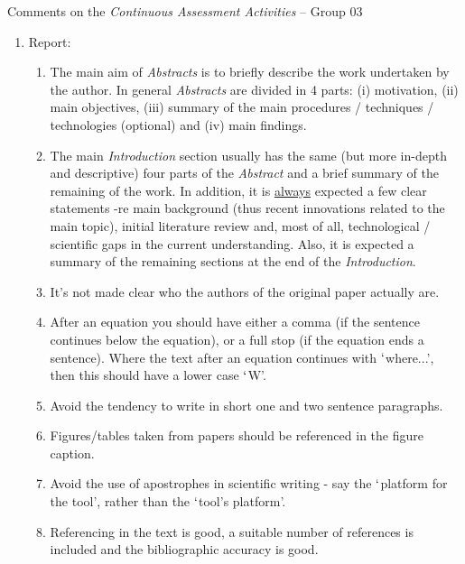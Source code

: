 \documentclass[14pt,twoside]{report}
\begin{document}
\clearpage



\bigskip

\begin{center}
  {\Large Comments on the {\it Continuous Assessment Activities} -- Group 03}
\end{center}

\begin{enumerate}

\item Report:
\begin{enumerate}
%
\item The main aim of {\it Abstracts} is to briefly describe the work undertaken by the author. In general {\it Abstracts} are divided in 4 parts: (i) motivation, (ii) main objectives, (iii) summary of the main procedures / techniques / technologies (optional) and (iv) main findings. 
%
\item The main {\it Introduction} section usually has the same (but more in-depth and descriptive) four parts of the {\it Abstract} and a brief summary of the remaining of the work. In addition, it is \underline{always} expected a few clear statements -re main background (thus recent innovations related to the main topic), initial literature review and, most of all, technological / scientific gaps in the current understanding. Also, it is expected a summary of the remaining sections at the end of the {\it Introduction}.
%
\item It's not made clear who the authors of the original paper actually are.
%
\item After an equation you should have either a comma (if the sentence continues below the equation), or a full stop (if the equation ends a sentence). Where the text after an equation continues with $\lq$where...', then this should have a lower case $\lq$W'.
%
\item Avoid the tendency to write in short one and two sentence paragraphs.
%
\item Figures/tables taken from papers should be referenced in the figure caption.
%
\item Avoid the use of apostrophes in scientific writing - say the $\lq$platform for the tool', rather than the $\lq$tool's platform'.
%
\item Referencing in the text is good, a suitable number of references is included and the bibliographic accuracy is good.

\end{enumerate}
\end{enumerate}
\end{document}
